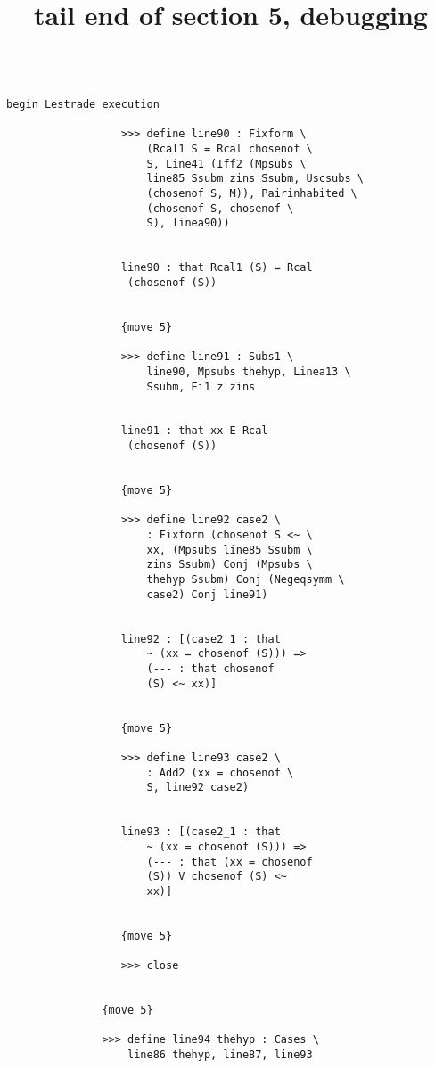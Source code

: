 \documentclass{article}
\title{tail end of section 5, debugging}
\begin{document}
\maketitle

\begin{verbatim}

begin Lestrade execution

                  >>> define line90 : Fixform \
                      (Rcal1 S = Rcal chosenof \
                      S, Line41 (Iff2 (Mpsubs \
                      line85 Ssubm zins Ssubm, Uscsubs \
                      (chosenof S, M)), Pairinhabited \
                      (chosenof S, chosenof \
                      S), linea90))


                  line90 : that Rcal1 (S) = Rcal 
                   (chosenof (S))


                  {move 5}

                  >>> define line91 : Subs1 \
                      line90, Mpsubs thehyp, Linea13 \
                      Ssubm, Ei1 z zins


                  line91 : that xx E Rcal 
                   (chosenof (S))


                  {move 5}

                  >>> define line92 case2 \
                      : Fixform (chosenof S <~ \
                      xx, (Mpsubs line85 Ssubm \
                      zins Ssubm) Conj (Mpsubs \
                      thehyp Ssubm) Conj (Negeqsymm \
                      case2) Conj line91)


                  line92 : [(case2_1 : that 
                      ~ (xx = chosenof (S))) => 
                      (--- : that chosenof 
                      (S) <~ xx)]


                  {move 5}

                  >>> define line93 case2 \
                      : Add2 (xx = chosenof \
                      S, line92 case2)


                  line93 : [(case2_1 : that 
                      ~ (xx = chosenof (S))) => 
                      (--- : that (xx = chosenof 
                      (S)) V chosenof (S) <~ 
                      xx)]


                  {move 5}

                  >>> close


               {move 5}

               >>> define line94 thehyp : Cases \
                   line86 thehyp, line87, line93



\end{verbatim}
\end{document}
